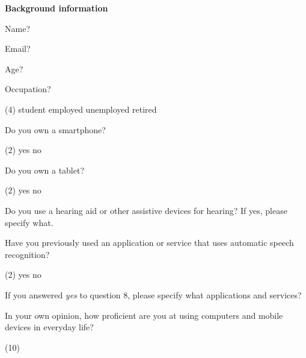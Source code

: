 \documentclass[english, 12pt, a4paper, pdftex, elec, utf8]{aaltothesis}
\begin{document}
{ \footnotesize %
    \noindent
    \hspace{0.35cm}
    \textbf{Background information}
    \vspace{0.15cm} 
    \begin{questionnaire}
        \item Name?
        \item Email?
        \item Age?
        \item Occupation?
        \begin{tasks}[label-width = 2em](4)
            \task student
            \task employed
            \task unemployed
            \task retired
        \end{tasks}
        \item Do you own a smartphone?
        \begin{tasks}[label-width = 2em](2)
            \task yes
            \task no
        \end{tasks}
        \item Do you own a tablet?
        \begin{tasks}[label-width = 2em](2)
            \task yes
            \task no
        \end{tasks}
        \item Do you use a hearing aid or other assistive devices for hearing? If yes, please specify what.
        \item Have you previously used an application or service that uses automatic speech recognition?
        \begin{tasks}[label-width = 2em](2)
            \task yes
            \task no
        \end{tasks}
        \item If you answered \textit{yes} to question 8, please specify what applications and services?
        \item In your own opinion, how proficient are you at using computers and mobile devices in everyday life?
        \begin{tasks}[](10)

\end{tasks}
\end{questionnaire}}
\end{document}
